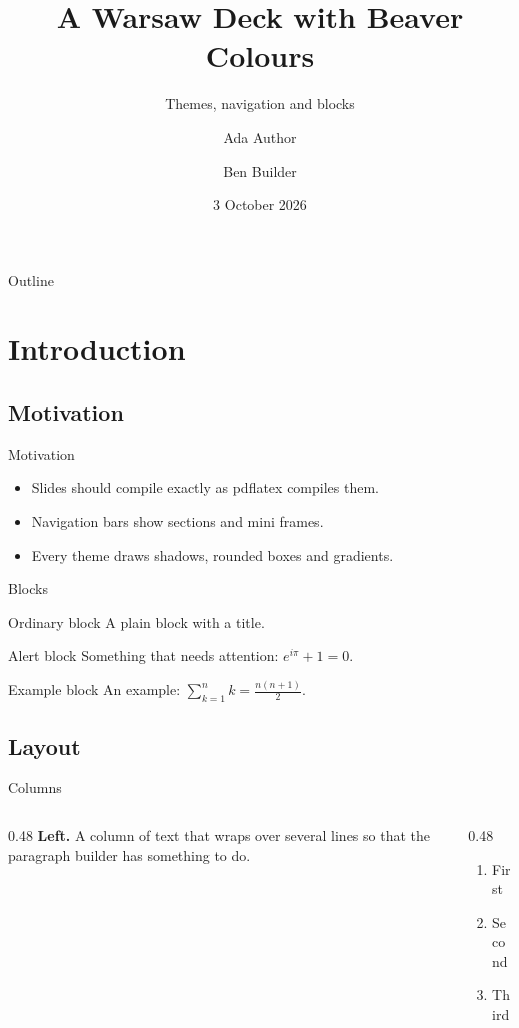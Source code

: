 \documentclass{beamer}
\title[Warsaw deck]{A Warsaw Deck with Beaver Colours}
\subtitle{Themes, navigation and blocks}
\author[A. Author]{Ada Author\inst{1} \and Ben Builder\inst{2}}
\institute[Inst.]{\inst{1}First Institute \and \inst{2}Second Institute}
\date{3 October 2026}
\begin{document}
\begin{frame}\titlepage\end{frame}
\begin{frame}{Outline}\tableofcontents\end{frame}
\section{Introduction}
\subsection{Motivation}
\begin{frame}{Motivation}
  \begin{itemize}
    \item Slides should compile exactly as pdflatex compiles them.
    \item Navigation bars show sections and mini frames.
    \item Every theme draws shadows, rounded boxes and gradients.
  \end{itemize}
\end{frame}
\begin{frame}{Blocks}
  \begin{block}{Ordinary block}
    A plain block with a title.
  \end{block}
  \begin{alertblock}{Alert block}
    Something that needs attention: $e^{i\pi}+1=0$.
  \end{alertblock}
  \begin{exampleblock}{Example block}
    An example: $\sum_{k=1}^{n} k = \frac{n(n+1)}{2}$.
  \end{exampleblock}
\end{frame}
\subsection{Layout}
\begin{frame}{Columns}
  \begin{columns}[T]
    \begin{column}{0.48\textwidth}
      \textbf{Left.} A column of text that wraps over several lines so that
      the paragraph builder has something to do.
    \end{column}
    \begin{column}{0.48\textwidth}
      \begin{enumerate}
        \item First
        \item Second
        \item Third
      \end{enumerate}
    \end{column}
  \end{columns}
\end{frame}
\end{document}
